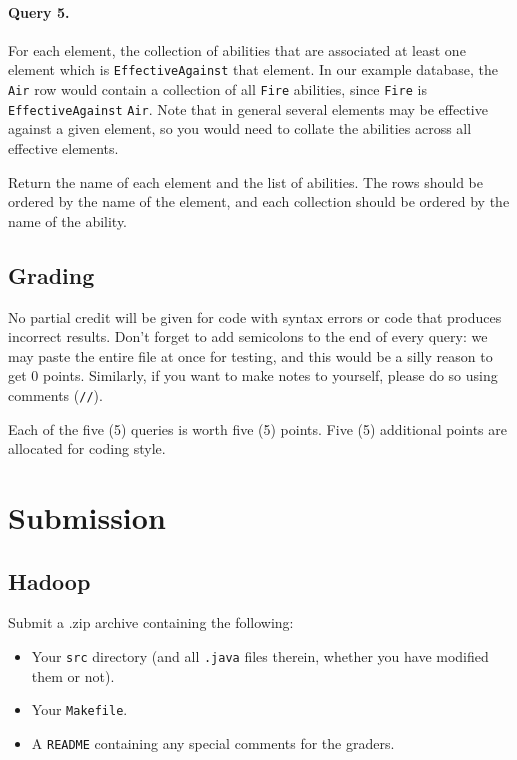 \documentclass[10pt]{article}
\begin{document}
\paragraph{Query 5.} For each element, the collection of abilities that are associated at least one element which is \texttt{EffectiveAgainst} that element. In our example database, the \texttt{Air} row would contain a collection of all \texttt{Fire} abilities, since \texttt{Fire} is \texttt{EffectiveAgainst} \texttt{Air}.  Note that in general several elements may be effective against a given element, so you would need to collate the abilities across all effective elements.

Return the name of each element and the list of abilities. The rows should be ordered by the name of the element, and each collection should be ordered by the name of the ability.

\subsection{Grading}

No partial credit will be given for code with syntax errors or code that produces incorrect results. Don't forget to add semicolons to the end of every query: we may paste the entire file at once for testing, and this would be a silly reason to get 0 points. Similarly, if you want to make notes to yourself, please do so using comments (\texttt{//}).

Each of the five (5) queries is worth five (5) points. Five (5) additional points are allocated for coding style.

\section{Submission}

\subsection{Hadoop}

Submit a .zip archive containing the following:

\begin{itemize}
	\item Your \texttt{src} directory (and all \texttt{.java} files therein, whether you have modified them or not).
	\item Your \texttt{Makefile}.
	\item A \texttt{README} containing any special comments for the graders.
\end{itemize}
\end{document}
